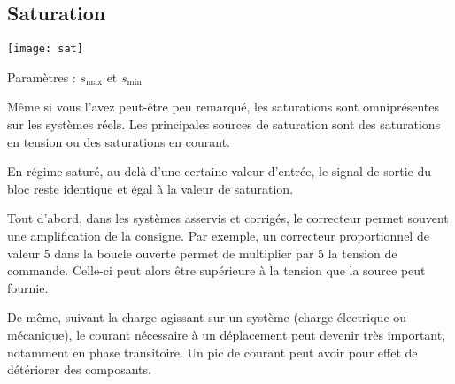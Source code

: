 \subsection{Saturation}

\begin{marginfigure}
\centering
\texttt{[image: sat]}

Paramètres : $s_{\text{max}}$ et $s_{\text{min}}$
\end{marginfigure}

\begin{marginfigure}
\centering
{}
\end{marginfigure}

Même si vous l'avez peut-être peu remarqué, les saturations sont omniprésentes sur les systèmes réels. Les principales sources de saturation sont des saturations en tension ou des saturations en courant. 

En régime saturé, au delà d'une certaine valeur d'entrée, le signal de sortie du bloc reste identique et égal à la valeur de saturation.




Tout d'abord, dans les systèmes asservis et corrigés, le correcteur permet souvent une amplification de la consigne. Par exemple, un correcteur proportionnel de valeur 5 dans la boucle ouverte permet de multiplier par 5 la tension de commande. Celle-ci peut alors être supérieure à la tension que la source peut fournie.

De même, suivant la charge agissant sur un système (charge électrique ou mécanique), le courant nécessaire à un déplacement peut devenir très important, notamment en phase transitoire. Un pic de courant peut avoir pour effet de détériorer des composants.


